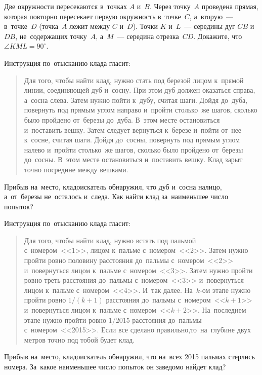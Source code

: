 \begin{problems}
\item
Две окружности пересекаются в~точках $A$ и~$B$.
Через точку~$A$ проведена прямая, которая повторно пересекает первую окружность
в~точке~$C$, а~вторую~--- в~точке~$D$
(точка~$A$ лежит между $C$ и~$D$).
Точки $K$ и~$L$~--- середины дуг $CB$ и~$DB$, не~содержащих точку~$A$,
а~$M$~--- середина отрезка~$CD$.
Докажите, что $\angle KML = 90^\circ$.

\item
Инструкция по~отысканию клада гласит:
\begin{quote}
Для того, чтобы найти клад, нужно стать под березой лицом к~прямой линии,
соединяющей дуб и~сосну.
При этом дуб должен оказаться справа, а~сосна слева.
Затем нужно пойти к~дубу, считая шаги.
Дойдя до~дуба, повернуть под прямым углом направо и~пройти столько~же шагов,
сколько было пройдено от~березы до~дуба.
В~этом месте остановиться и~поставить вешку.
Затем следует вернуться к~березе и~пойти от~нее к~сосне, считая шаги.
Дойдя до~сосны, повернуть под прямым углом налево и~пройти столько~же шагов,
сколько было пройдено от~березы до~сосны.
В~этом месте остановиться и~поставить вешку.
Клад зарыт точно посредине между вешками.
\end{quote}
Прибыв на~место, кладоискатель обнаружил, что дуб и~сосна налицо, а~от~березы
не~осталось и~следа.
Как найти клад за~наименьшее число попыток?

\item
Инструкция по~отысканию клада гласит:
\begin{quote}
Для того, чтобы найти клад, нужно встать под пальмой с~номером~<<1>>, лицом
к~пальме с~номером~<<2>>.
Затем нужно пройти ровно половину расстояния до~пальмы с~номером~<<2>>
и~повернуться лицом к~пальме с~номером~<<3>>.
Затем нужно пройти ровно треть расстояния до~пальмы с~номером~<<3>>
и~повернуться лицом к~пальме с~номером~<<4>>.
И~так далее.
На~$k$-ом этапе нужно пройти ровно $1 / (k + 1)$ расстояния до~пальмы
с~номером~<<$k+1$>> и~повернуться лицом к~пальме с~номером~<<$k+2$>>.
На~последнем этапе нужно пройти ровно $1 / 2015$ расстояния до~пальмы
с~номером~<<2015>>.
Если все сделано правильно,то~на~глубине двух метров точно под тобой будет
клад.
\end{quote}
Прибыв на~место, кладоискатель обнаружил, что на~всех 2015 пальмах стерлись
номера.
За~какое наименьшее число попыток он заведомо найдет клад?

\end{problems}

